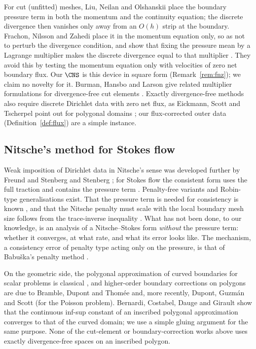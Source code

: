 For cut (unfitted) meshes, Liu, Neilan and Olshanskii \cite{LiuNeilanOlshanskii2023} place the boundary pressure term in both the momentum and the continuity equation; the discrete divergence then vanishes only away from an $O(h)$ strip at the boundary. Frachon, Nilsson and Zahedi \cite{FrachonNilssonZahedi2024} place it in the momentum equation only, so as not to perturb the divergence condition, and show that fixing the pressure mean by a Lagrange multiplier makes the discrete divergence equal to that multiplier \cite[(5.7)--(5.9)]{FrachonNilssonZahedi2024}. They avoid this by testing the momentum equation only with velocities of zero net boundary flux. Our $\CNS$ is this device in square form (Remark~\ref{rem:fnz}); we claim no novelty for it. Burman, Hansbo and Larson give related multiplier formulations for divergence-free cut elements \cite{BurmanHansboLarson2024}. Exactly divergence-free methods also require discrete Dirichlet data with zero net flux, as Eickmann, Scott and Tscherpel point out for polygonal domains \cite{EickmannScottTscherpel2025}; our flux-corrected outer data (Definition~\ref{def:flux}) are a simple instance.

\subsection{Nitsche's method for Stokes flow}
Weak imposition of Dirichlet data in Nitsche's sense was developed further by Freund and Stenberg \cite{FreundStenberg1995} and Stenberg \cite{Stenberg1995}; for Stokes flow the consistent form uses the full traction and contains the pressure term \cite{FreundStenberg1995,Stenberg1995,Becker2002,BurmanHansbo2014}. Penalty-free variants \cite{Burman2012,BoiveauBurman2016} and Robin-type generalisations \cite{JuntunenStenberg2009} exist. That the pressure term is needed for consistency is known \cite{BurmanHansboLarson2019Stokes}, and that the Nitsche penalty must scale with the local boundary mesh size follows from the trace-inverse inequality \cite{Stenberg1995,JuntunenStenberg2009}. What has not been done, to our knowledge, is an analysis of a Nitsche--Stokes form \emph{without} the pressure term: whether it converges, at what rate, and what its error looks like. The mechanism, a consistency error of penalty type acting only on the pressure, is that of Babu\v{s}ka's penalty method \cite{Babuska1973}.

On the geometric side, the polygonal approximation of curved boundaries for scalar problems is classical \cite{BergerScottStrang1972,Scott1975}, and higher-order boundary corrections on polygons are due to Bramble, Dupont and Thom\'ee \cite{BrambleDupontThomee1972} and, more recently, Dupont, Guzm\'an and Scott \cite{DupontGuzmanScott2025} (for the Poisson problem). Bernardi, Costabel, Dauge and Girault \cite{BCDG2016} show that the continuous inf-sup constant of an inscribed polygonal approximation converges to that of the curved domain; we use a simple gluing argument for the same purpose. None of the cut-element or boundary-correction works above uses exactly divergence-free spaces on an inscribed polygon.

